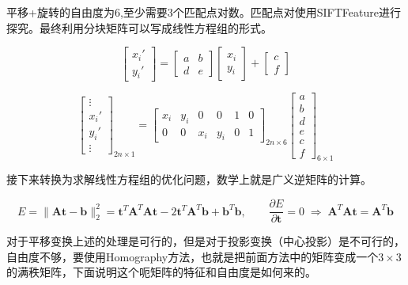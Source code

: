 平移+旋转的自由度为6,至少需要3个匹配点对数。匹配点对使用SIFTFeature进行探究。最终利用分块矩阵可以写成线性方程组的形式。

\[
\begin{bmatrix} x_i' \\ y_i' \end{bmatrix}
=
\begin{bmatrix} a & b \\ d & e \end{bmatrix}
\begin{bmatrix} x_i \\ y_i \end{bmatrix}
+
\begin{bmatrix} c \\ f \end{bmatrix}
\]

\[
\begin{bmatrix} \vdots \\ x_i' \\ y_i' \\ \vdots \end{bmatrix}_{2n \times 1}
=
\begin{bmatrix} x_i & y_i & 0 & 0 & 1 & 0 \\ 0 & 0 & x_i & y_i & 0 & 1 \end{bmatrix}_{2n \times 6}
\begin{bmatrix} a \\ b \\ d \\ e \\ c \\ f \end{bmatrix}_{6 \times 1}
\]

接下来转换为求解线性方程组的优化问题，数学上就是广义逆矩阵的计算。

\[
E = \|\boldsymbol{A}\boldsymbol{t} - \boldsymbol{b}\|_2^2
= \boldsymbol{t}^T \boldsymbol{A}^T \boldsymbol{A} \boldsymbol{t}
- 2 \boldsymbol{t}^T \boldsymbol{A}^T \boldsymbol{b}
+ \boldsymbol{b}^T \boldsymbol{b},
\qquad
\frac{\partial E}{\partial \boldsymbol{t}} = 0
\;\Longrightarrow\;
\boldsymbol{A}^T \boldsymbol{A} \boldsymbol{t} = \boldsymbol{A}^T \boldsymbol{b}
\]

对于平移变换上述的处理是可行的，但是对于投影变换（中心投影）是不可行的，自由度不够，要使用Homography方法，也就是把前面方法中的矩阵变成一个$3\times3$的满秩矩阵，下面说明这个呃矩阵的特征和自由度是如何来的。

